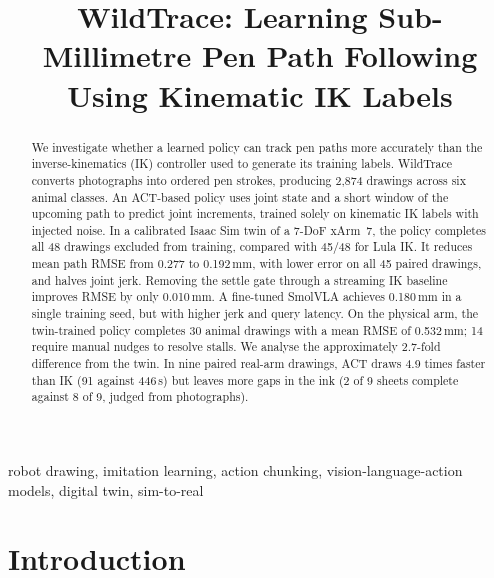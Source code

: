 \documentclass[conference]{IEEEtran}
\newcommand{\mm}{\,mm\xspace}
\begin{document}
\title{WildTrace: Learning Sub-Millimetre Pen Path Following Using Kinematic IK Labels}

\author{
}

\maketitle

\begin{abstract}
We investigate whether a learned policy can track pen paths more accurately than the inverse-kinematics (IK)
controller used to generate its training labels. WildTrace converts photographs into ordered pen strokes,
producing 2,874 drawings across six animal classes. An ACT-based policy uses joint state and a short window of
the upcoming path to predict joint increments, trained solely on kinematic IK labels with injected noise. In a
calibrated Isaac Sim twin of a 7-DoF xArm~7, the policy completes all 48 drawings excluded from training,
compared with 45/48 for Lula IK. It reduces mean path RMSE from 0.277 to 0.192\mm, with lower error on all 45
paired drawings, and halves joint jerk. Removing the settle gate through a streaming IK baseline improves RMSE by
only 0.010\mm. A fine-tuned SmolVLA achieves 0.180\mm in a single training seed, but with higher jerk and query
latency. On the physical arm, the twin-trained policy completes 30 animal drawings with a mean RMSE of 0.532\mm;
14 require manual nudges to resolve stalls. We analyse the approximately 2.7-fold difference from the twin. In
nine paired real-arm drawings, ACT draws 4.9 times faster than IK (91 against 446\,s) but leaves more gaps in the
ink (2 of 9 sheets complete against 8 of 9, judged from photographs).
\end{abstract}

\begin{IEEEkeywords}
robot drawing, imitation learning, action chunking, vision-language-action models, digital twin, sim-to-real
\end{IEEEkeywords}

\section{Introduction}
\end{document}
